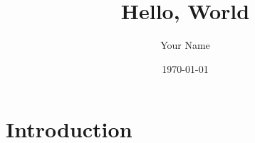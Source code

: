 \documentclass{article}
\title{Hello, World}
\author{Your Name}
\date{\today{}}
\begin{document}
\maketitle

\section{Introduction}
\end{document}
